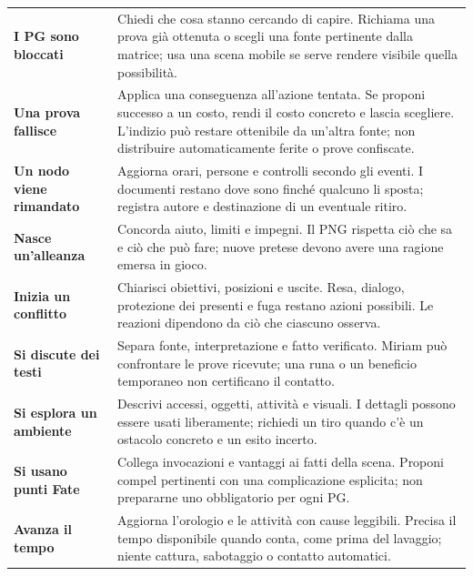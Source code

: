 \documentclass[11pt,a4paper]{article}
\begin{document}
\begin{tabularx}{\linewidth}{>{\bfseries}p{34mm} X}
I PG sono bloccati & Chiedi che cosa stanno cercando di capire. Richiama una prova già ottenuta o scegli una fonte pertinente dalla matrice; usa una scena mobile se serve rendere visibile quella possibilità.\\
Una prova fallisce & Applica una conseguenza all'azione tentata. Se proponi successo a un costo, rendi il costo concreto e lascia scegliere. L'indizio può restare ottenibile da un'altra fonte; non distribuire automaticamente ferite o prove confiscate.\\
Un nodo viene rimandato & Aggiorna orari, persone e controlli secondo gli eventi. I documenti restano dove sono finché qualcuno li sposta; registra autore e destinazione di un eventuale ritiro.\\
Nasce un'alleanza & Concorda aiuto, limiti e impegni. Il PNG rispetta ciò che sa e ciò che può fare; nuove pretese devono avere una ragione emersa in gioco.\\
Inizia un conflitto & Chiarisci obiettivi, posizioni e uscite. Resa, dialogo, protezione dei presenti e fuga restano azioni possibili. Le reazioni dipendono da ciò che ciascuno osserva.\\
Si discute dei testi & Separa fonte, interpretazione e fatto verificato. Miriam può confrontare le prove ricevute; una runa o un beneficio temporaneo non certificano il contatto.\\
Si esplora un ambiente & Descrivi accessi, oggetti, attività e visuali. I dettagli possono essere usati liberamente; richiedi un tiro quando c'è un ostacolo concreto e un esito incerto.\\
Si usano punti Fate & Collega invocazioni e vantaggi ai fatti della scena. Proponi compel pertinenti con una complicazione esplicita; non prepararne uno obbligatorio per ogni PG.\\
Avanza il tempo & Aggiorna l'orologio e le attività con cause leggibili. Precisa il tempo disponibile quando conta, come prima del lavaggio; niente cattura, sabotaggio o contatto automatici.\\
\end{tabularx}
\end{document}
